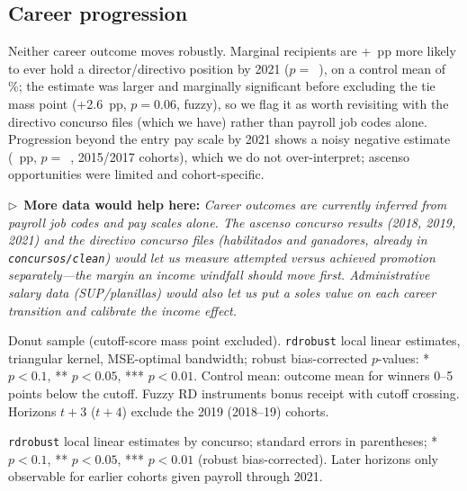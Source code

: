 \documentclass[11pt]{article}
\newcommand{\dataneed}[1]{\par\medskip\noindent\begin{small}\noindent
$\triangleright$~\textbf{More data would help here:} \emph{#1}\end{small}\par\medskip}
\begin{document}
\subsection{Career progression}

Neither career outcome moves robustly. Marginal recipients are
+\DirectorRF~pp more likely to ever hold a director/directivo position by
2021 ($p=$~\DirectorP), on a control mean of \DirectorMean\%; the estimate
was larger and marginally significant before excluding the tie mass point
(+2.6~pp, $p=0.06$, fuzzy), so we flag it as worth revisiting with the
directivo concurso files (which we have) rather than payroll job codes alone.
Progression beyond the entry pay scale by 2021 shows a noisy negative
estimate (\PromotedRF~pp, $p=$~\PromotedP, 2015/2017 cohorts), which we do
not over-interpret; ascenso opportunities were limited and cohort-specific.

\dataneed{Career outcomes are currently inferred from payroll job codes and
pay scales alone. The ascenso concurso results (2018, 2019, 2021) and the
directivo concurso files (habilitados and ganadores, already in
\texttt{concursos/clean}) would let us measure \emph{attempted} versus
\emph{achieved} promotion separately---the margin an income windfall should
move first. Administrative salary data (SUP/planillas) would also let us put
a soles value on each career transition and calibrate the income effect.}

\begin{table}[htbp]
\centering
\caption{RD estimates: acceptance, retention, and career outcomes (pooled)}
\label{tab:outcomes}
\begin{threeparttable}
\small

\begin{tablenotes}\footnotesize
\item Donut sample (cutoff-score mass point excluded). \texttt{rdrobust}
local linear estimates, triangular kernel, MSE-optimal bandwidth; robust
bias-corrected $p$-values: * $p<0.1$, ** $p<0.05$, *** $p<0.01$. Control mean:
outcome mean for winners 0--5 points below the cutoff. Fuzzy RD instruments
bonus receipt with cutoff crossing. Horizons $t+3$ ($t+4$) exclude the 2019
(2018--19) cohorts.
\end{tablenotes}
\end{threeparttable}
\end{table}

\begin{table}[htbp]
\centering
\caption{RD estimates by cohort (donut sample, reduced form)}
\label{tab:cohorts}
\begin{threeparttable}

\begin{tablenotes}\footnotesize
\item \texttt{rdrobust} local linear estimates by concurso; standard errors
in parentheses; * $p<0.1$, ** $p<0.05$, *** $p<0.01$ (robust bias-corrected).
Later horizons only observable for earlier cohorts given payroll through
2021.
\end{tablenotes}
\end{threeparttable}
\end{table}
\end{document}
